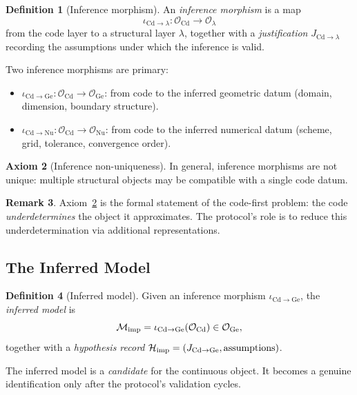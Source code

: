 \documentclass[11pt,a4paper]{article}
\theoremstyle{definition}
\newtheorem{definition}{Definition}[section]
\newtheorem{remark}[definition]{Remark}
\newtheorem{axiom}[definition]{Axiom}
\theoremstyle{plain}
\newcommand{\Ge}{\mathrm{Ge}}
\newcommand{\Nu}{\mathrm{Nu}}
\newcommand{\Cd}{\mathrm{Cd}}
\newcommand{\Mcal}{\mathcal{M}}
\newcommand{\Hcal}{\mathcal{H}}
\newcommand{\Ocal}{\mathcal{O}}
\begin{document}
\begin{definition}[Inference morphism]\label{def:inference}
An \emph{inference morphism} is a map
\[
  \iota_{\Cd \to \lambda} : \Ocal_\Cd \to \Ocal_\lambda
\]
from the code layer to a structural layer $\lambda$, together with
a \emph{justification} $J_{\Cd \to \lambda}$ recording the
assumptions under which the inference is valid.
\end{definition}

Two inference morphisms are primary:

\begin{itemize}
  \item $\iota_{\Cd \to \Ge} : \Ocal_\Cd \to \Ocal_\Ge$: from code
        to the inferred geometric datum (domain, dimension,
        boundary structure).
  \item $\iota_{\Cd \to \Nu} : \Ocal_\Cd \to \Ocal_\Nu$: from code
        to the inferred numerical datum (scheme, grid, tolerance,
        convergence order).
\end{itemize}

\begin{axiom}[Inference non-uniqueness]\label{ax:non-unique}
In general, inference morphisms are not unique: multiple structural
objects may be compatible with a single code datum.
\end{axiom}

\begin{remark}
Axiom~\ref{ax:non-unique} is the formal statement of the
code-first problem: the code \emph{underdetermines} the object it
approximates. The protocol's role is to reduce this
underdetermination via additional representations.
\end{remark}

\subsection{The Inferred Model}

\begin{definition}[Inferred model]\label{def:inferred-model}
Given an inference morphism $\iota_{\Cd \to \Ge}$, the
\emph{inferred model} is
\[
  \Mcal_{\rm imp} = \iota_{\Cd \to \Ge}(\Ocal_\Cd) \in \Ocal_\Ge,
\]
together with a \emph{hypothesis record}
$\Hcal_{\rm imp} = (J_{\Cd \to \Ge}, \text{assumptions})$.
\end{definition}

The inferred model is a \emph{candidate} for the continuous object.
It becomes a genuine identification only after the protocol's
validation cycles.
\end{document}
